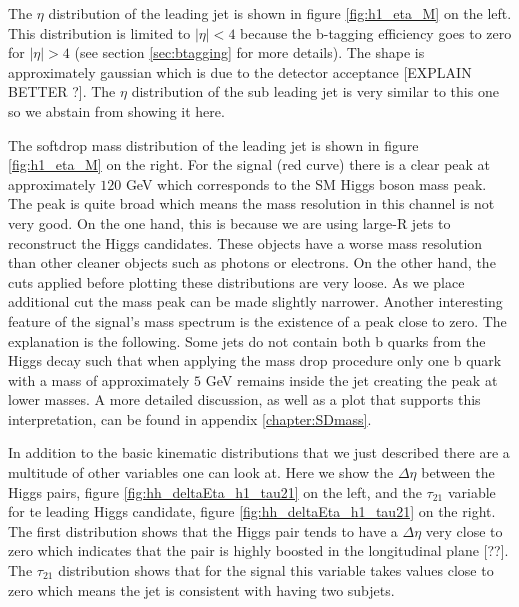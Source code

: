 The $\eta$ distribution of the leading jet is shown in figure \ref{fig:h1_eta_M} on the left. This distribution is limited to $|\eta|<4$ because the b-tagging efficiency goes to zero for $|\eta|>4$ (see section \ref{sec:btagging} for more details). The shape is approximately gaussian which is due to the detector acceptance [EXPLAIN BETTER ?]. The $\eta$ distribution of the sub leading jet is very similar to this one so we abstain from showing it here.

The softdrop mass distribution of the leading jet is shown in figure \ref{fig:h1_eta_M} on the right. For the signal (red curve) there is a clear peak at approximately $120$ GeV which corresponds to the SM Higgs boson mass peak. The peak is quite broad which means the mass resolution in this channel is not very good. On the one hand, this is because we are using large-R jets to reconstruct the Higgs candidates. These objects have a worse mass resolution than other cleaner objects such as photons or electrons.  On the other hand, the cuts applied before plotting these distributions are very loose. As we place additional cut the mass peak can be made slightly narrower. Another interesting feature of the signal's mass spectrum is the existence of a peak close to zero. The explanation is the following. Some jets do not contain both b quarks from the Higgs decay such that when applying the mass drop procedure only one b quark with a mass of approximately $5$ GeV remains inside the jet creating the peak at lower masses. A more detailed discussion, as well as a plot that supports this interpretation, can be found in appendix \ref{chapter:SDmass}.

In addition to the basic kinematic distributions that we just described there are a multitude of other variables one can look at. Here we show the $\Delta\eta$ between the Higgs pairs, figure \ref{fig:hh_deltaEta_h1_tau21} on the left, and the $\tau_{21}$ variable for te leading Higgs candidate, figure \ref{fig:hh_deltaEta_h1_tau21} on the right. The first distribution shows that the Higgs pair tends to have a $\Delta\eta$ very close to zero which indicates that the pair is highly boosted in the longitudinal plane [??]. The $\tau_{21}$ distribution shows that for the signal this variable takes values close to zero which means the jet is consistent with having two subjets.


